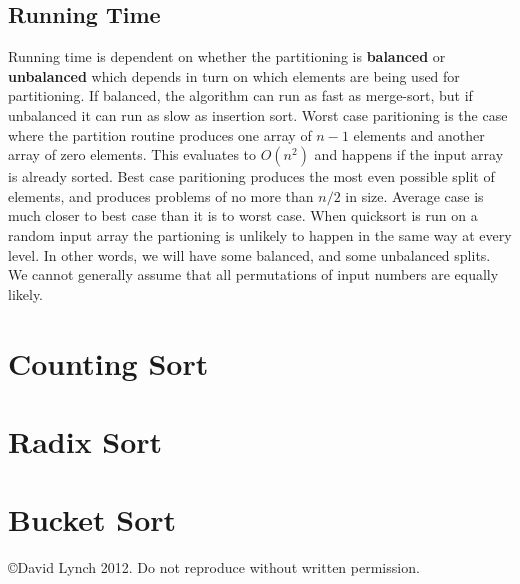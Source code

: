 \documentclass[10pt,a4paper]{article}
\begin{document}
\subsection{Running Time}
Running time is dependent on whether the partitioning is {\bf balanced} or {\bf unbalanced} which depends in turn on which elements are being used for partitioning. If balanced, the algorithm can run as fast as merge-sort, but if unbalanced it can run as slow as insertion sort. Worst case paritioning is the case where the partition routine produces one array of $n-1$ elements and another array of zero elements. This evaluates to $O(n^2)$ and happens if the input array is already sorted. Best case paritioning produces the most even possible split of elements, and produces problems of no more than $n/2$ in size. Average case is much closer to best case than it is to worst case. When quicksort is run on a random input array the partioning is unlikely to happen in the same way at every level. In other words, we will have some balanced, and some unbalanced splits. We cannot generally assume that all permutations of input numbers are equally likely. 


\section{Counting Sort}



\section{Radix Sort}


\section{Bucket Sort}

{}

\begin{center}
{\small \copyright  David Lynch 2012. Do not reproduce without written permission.}
\end{center}
\end{document}
